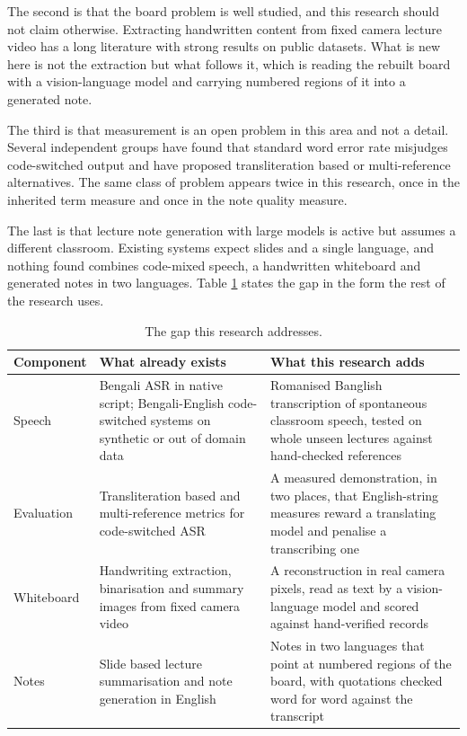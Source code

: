 The second is that the board problem is well studied, and this research should not
claim otherwise. Extracting
handwritten content from fixed camera lecture video has a long literature with strong
results on public datasets. What is new here is not the extraction but what follows it,
which is reading the rebuilt board with a vision-language model and carrying numbered
regions of it into a generated note.

The third is that measurement is an open problem in this area and not a detail. Several independent
groups have found that standard word error rate misjudges code-switched output and have
proposed transliteration based or multi-reference alternatives. The same class of problem
appears twice in this research, once in the inherited term measure and once in the note
quality measure.

The last is that lecture note generation with large models is active but assumes a
different classroom.
Existing systems expect slides and a single language, and nothing found combines
code-mixed speech, a handwritten whiteboard and generated notes in two languages. Table
\ref{tab:gap} states the gap in the form the rest of the research uses.

\begin{table}[htbp]
\centering
\caption{The gap this research addresses.}
\label{tab:gap}
\small
\begin{tabular}{p{2.8cm}p{5.4cm}p{5.4cm}}
\toprule
Component & What already exists & What this research adds \\
\midrule
Speech &
Bengali ASR in native script; Bengali-English code-switched systems on synthetic or out
of domain data &
Romanised Banglish transcription of spontaneous classroom speech, tested on whole unseen
lectures against hand-checked references \\
\addlinespace
Evaluation &
Transliteration based and multi-reference metrics for code-switched ASR &
A measured demonstration, in two places, that English-string measures reward a
translating model and penalise a transcribing one \\
\addlinespace
Whiteboard &
Handwriting extraction, binarisation and summary images from fixed camera video &
A reconstruction in real camera pixels, read as text by a vision-language model and
scored against hand-verified records \\
\addlinespace
Notes &
Slide based lecture summarisation and note generation in English &
Notes in two languages that point at numbered regions of the board, with quotations
checked word for word against the transcript \\
\bottomrule
\end{tabular}
\end{table}
